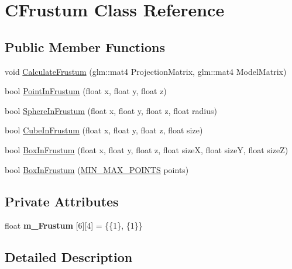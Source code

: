 \hypertarget{class_c_frustum}{}\section{C\+Frustum Class Reference}
\label{class_c_frustum}
\subsection*{Public Member Functions}
\begin{DoxyCompactItemize}
\item 
void \hyperlink{class_c_frustum_a9c1738062b94376ab2b754bfd6b4c363}{Calculate\+Frustum} (glm\+::mat4 Projection\+Matrix, glm\+::mat4 Model\+Matrix)
\item 
bool \hyperlink{class_c_frustum_aff4dd14b8d2528621030756d21e37d7f}{Point\+In\+Frustum} (float x, float y, float z)
\item 
bool \hyperlink{class_c_frustum_af05ef901019c29f46d145c6ebe6ea62c}{Sphere\+In\+Frustum} (float x, float y, float z, float radius)
\item 
bool \hyperlink{class_c_frustum_a02d4b3e95c33f9f83fc4104a3f5363e5}{Cube\+In\+Frustum} (float x, float y, float z, float size)
\item 
bool \hyperlink{class_c_frustum_a06155e722ef85cce62f65d8667cf41fb}{Box\+In\+Frustum} (float x, float y, float z, float sizeX, float sizeY, float sizeZ)
\item 
bool \hyperlink{class_c_frustum_a34e0f4eee50fa86ab4dfbdb2b1a78264}{Box\+In\+Frustum} (\hyperlink{struct_m_i_n___m_a_x___p_o_i_n_t_s}{M\+I\+N\+\_\+\+M\+A\+X\+\_\+\+P\+O\+I\+N\+TS} points)
\end{DoxyCompactItemize}
\subsection*{Private Attributes}
\begin{DoxyCompactItemize}
\item 
float {\bfseries m\+\_\+\+Frustum} \mbox{[}6\mbox{]}\mbox{[}4\mbox{]} = \{\{1\}, \{1\}\}\hypertarget{class_c_frustum_a2673b79facea7c41014cc9afdd7af138}{}\label{class_c_frustum_a2673b79facea7c41014cc9afdd7af138}

\end{DoxyCompactItemize}


\subsection{Detailed Description}



